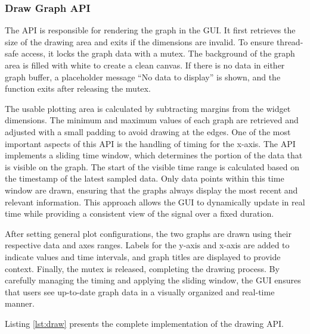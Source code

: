 \subsubsection{Draw Graph API}
The  API is responsible for rendering the graph in the GUI. It first 
retrieves the size of the drawing area and exits if the dimensions are invalid. To ensure 
thread-safe access, it locks the graph data with a mutex. The background of the graph 
area is filled with white to create a clean canvas. If there is no data in either graph 
buffer, a placeholder message “No data to display” is shown, and the function exits after 
releasing the mutex.

The usable plotting area is calculated by subtracting margins from the widget dimensions. 
The minimum and maximum values of each graph are retrieved and adjusted with a small 
padding to avoid drawing at the edges. One of the most important aspects of this API is 
the handling of timing for the x-axis. The API implements a sliding time window, which 
determines the portion of the data that is visible on the graph. The start of the visible 
time range is calculated based on the timestamp of the latest sampled data. Only data 
points within this time window are drawn, ensuring that the graphs always display the most 
recent and relevant information. This approach allows the GUI to dynamically update in 
real time while providing a consistent view of the signal over a fixed duration.

After setting general plot configurations, the two graphs are drawn using their respective 
data and axes ranges. Labels for the y-axis and x-axis are added to indicate values and 
time intervals, and graph titles are displayed to provide context. Finally, the mutex is 
released, completing the drawing process. By carefully managing the timing and applying 
the sliding window, the GUI ensures that users see up-to-date graph data in a visually 
organized and real-time manner.

Listing \ref{lst:draw} presents the complete implementation of the drawing API.


